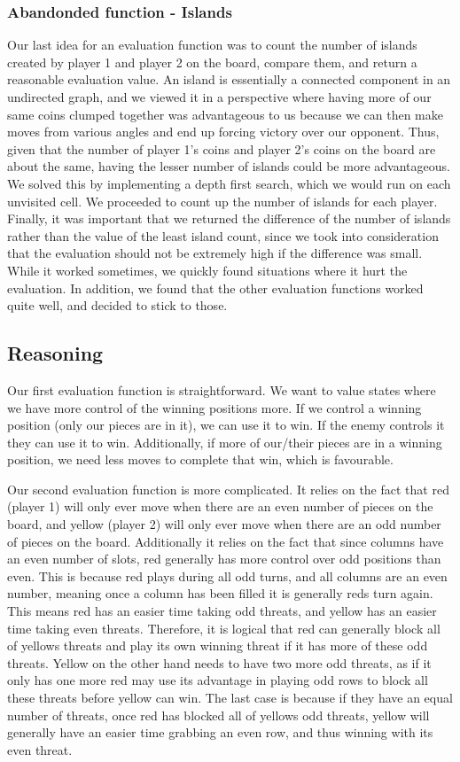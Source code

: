 \documentclass{article}
\begin{document}
\subsubsection{Abandonded function - Islands}
Our last idea for an evaluation function was to count the number of islands created by player 1 and player 2 on the board, compare them, and return a reasonable evaluation value. An island is essentially a connected component in an undirected graph, and we viewed it in a perspective where having more of our same coins clumped together was advantageous to us because we can then make moves from various angles and end up forcing victory over our opponent. Thus, given that the number of player 1's coins and player 2's coins on the board are about the same, having the lesser number of islands could be more advantageous. We solved this by implementing a depth first search, which we would run on each unvisited cell. We proceeded to count up the number of islands for each player. Finally, it was important that we returned the difference of the number of islands rather than the value of the least island count, since we took into consideration that the evaluation should not be extremely high if the difference was small. While it worked sometimes, we quickly found situations where it hurt the evaluation. In addition, we found that the other evaluation functions worked quite well, and decided to stick to those. 

\subsection{Reasoning}
\label{ssec:reasoning}
Our first evaluation function is straightforward. We want to value states where we have more control of the winning positions more. If we control a winning position (only our pieces are in it), we can use it to win. If the enemy controls it they can use it to win. Additionally, if more of our/their pieces are in a winning position, we need less moves to complete that win, which is favourable.
		
Our second evaluation function is more complicated. It relies on the fact that red (player 1) will only ever move when there are an even number of pieces on the board, and yellow (player 2) will only ever move when there are an odd number of pieces on the board. Additionally it relies on the fact that since columns have an even number of slots, red generally has more control over odd positions than even. This is because red plays during all odd turns, and all columns are an even number, meaning once a column has been filled it is generally reds turn again. This means red has an easier time taking odd threats, and yellow has an easier time taking even threats. Therefore, it is logical that red can generally block all of yellows threats and play its own winning threat if it has more of these odd threats. Yellow on the other hand needs to have two more odd threats, as if it only has one more red may use its advantage in playing odd rows to block all these threats before yellow can win. The last case is because if they have an equal number of threats, once red has blocked all of yellows odd threats, yellow will generally have an easier time grabbing an even row, and thus winning with its even threat.
		
\end{document}
